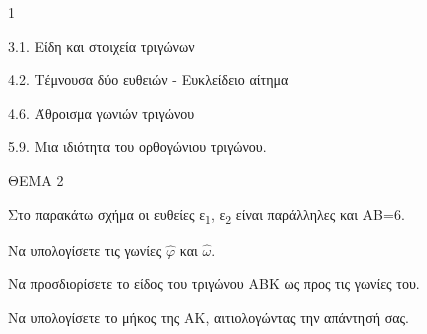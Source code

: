 \begin{ylh}{1}
    \item 3.1. Είδη και στοιχεία τριγώνων
    \item 4.2. Τέμνουσα δύο ευθειών - Ευκλείδειο αίτημα
    \item 4.6. Άθροισμα γωνιών τριγώνου
    \item 5.9. Μια ιδιότητα του ορθογώνιου τριγώνου.
\end{ylh}

ΘΕΜΑ 2

Στο παρακάτω σχήμα οι ευθείες ε\textsubscript{1}, ε\textsubscript{2} είναι παράλληλες και AB=6.

\begin{alist}
\item Να υπολογίσετε τις γωνίες $\widehat{\varphi}$ και $\widehat{\omega}$. 

\item Να προσδιορίσετε το είδος του τριγώνου ΑΒΚ ως προς τις γωνίες του. 

\item Να υπολογίσετε το μήκος της ΑΚ, αιτιολογώντας την απάντησή σας. 


\begin{center}
\end{center}
\end{alist}
